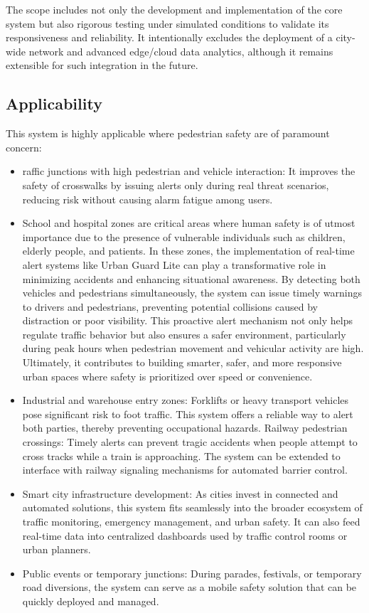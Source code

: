\documentclass[a4paper, 12pt]{report}
\begin{document}
The scope includes not only the development and implementation of the core system but also rigorous testing under simulated conditions to validate its responsiveness and reliability. It intentionally excludes the deployment of a city-wide network and advanced edge/cloud data analytics, although it remains extensible for such integration in the future.
\subsection{Applicability}
This system is highly applicable where pedestrian safety are of paramount concern:
\begin{itemize}[itemsep=-4pt]
    \item raffic junctions with high pedestrian and vehicle interaction:
It improves the safety of crosswalks by issuing alerts only during real threat scenarios, reducing risk without causing alarm fatigue among users.

    \item School and hospital zones are critical areas where human safety is of utmost importance due to the presence of vulnerable individuals such as children, elderly people, and patients. In these zones, the implementation of real-time alert systems like Urban Guard Lite can play a transformative role in minimizing accidents and enhancing situational awareness. By detecting both vehicles and pedestrians simultaneously, the system can issue timely warnings to drivers and pedestrians, preventing potential collisions caused by distraction or poor visibility. This proactive alert mechanism not only helps regulate traffic behavior but also ensures a safer environment, particularly during peak hours when pedestrian movement and vehicular activity are high. Ultimately, it contributes to building smarter, safer, and more responsive urban spaces where safety is prioritized over speed or convenience.
    
    \item Industrial and warehouse entry zones:
Forklifts or heavy transport vehicles pose significant risk to foot traffic. This system offers a reliable way to alert both parties, thereby preventing occupational hazards.
Railway pedestrian crossings:
Timely alerts can prevent tragic accidents when people attempt to cross tracks while a train is approaching. The system can be extended to interface with railway signaling mechanisms for automated barrier control.

    \item Smart city infrastructure development:
As cities invest in connected and automated solutions, this system fits seamlessly into the broader ecosystem of traffic monitoring, emergency management, and urban safety. It can also feed real-time data into centralized dashboards used by traffic control rooms or urban planners.

    \item Public events or temporary junctions:
During parades, festivals, or temporary road diversions, the system can serve as a mobile safety solution that can be quickly deployed and managed.
\end{itemize}
\end{document}
